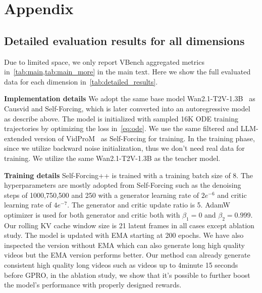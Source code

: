 \section{Appendix}

\subsection{Detailed evaluation results for all dimensions}
Due to limited space, we only report VBench aggregated metrics in~\cref{tab:main,tab:main_more} in the main text. Here we show the full evaluated data for each dimension in~\cref{tab:detailed_results}.







\textbf{Implementation details} We adopt the same base model Wan2.1-T2V-1.3B~\citep{wan2025} as Causvid and Self-Forcing, which is later converted into an autoregressive model as describe above. The model is initialized with sampled 16K ODE training trajectories by optimizing the loss in~\cref{eq:ode}. We use the same filtered and LLM-extended version of VidProM~\citep{wang2024vidprom} as Self-Forcing for training. In the training phase, since we utilize backward noise initialization, thus we don't need real data for training. We utilize the same Wan2.1-T2V-1.3B as the teacher model.

\textbf{Training details}
Self-Forcing++ is trained with a training batch size of 8. The hyperparameters are mostly adopted from Self-Forcing such as the denoising steps of 1000,750,500 and 250 with a generator learning rate of $2e^{-6}$ and critic learning rate of $4e^{-7}$. The generator and critic update ratio is 5. AdamW optimizer is used for both generator and critic both with $\beta_1=0$ and $\beta_2=0.999$. Our rolling KV cache window size is 21 latent frames in all cases except ablation study. The model is updated with EMA starting at 200 epochs. We have also inspected the version without EMA which can also generate long high quality videos but the EMA version performs better. Our method can already generate consistent high quality long videos such as videos up to 4minute 15 seconds before GPRO, in the ablation study, we show that it's possible to further boost the model's performance with properly designed rewards.


